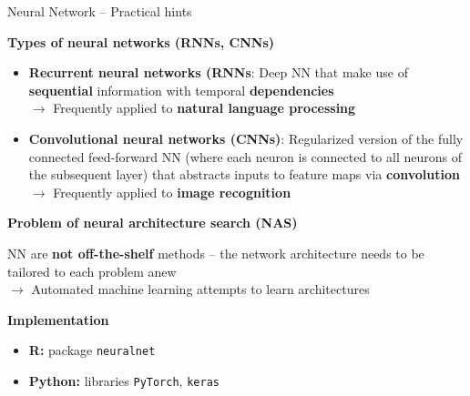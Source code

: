 \documentclass[11pt,compress,t,notes=noshow, xcolor=table]{beamer}
\newcommand{\highlight}[1]{\textcolor{highlightcol}{\textbf{#1}}}
\let\code=\texttt
\begin{document}
\begin{frame}{Neural Network -- Practical hints}

\footnotesize

\highlight{Types of neural networks (RNNs, CNNs)}

\begin{itemize}
  \item \textbf{Recurrent neural networks (RNNs}: Deep NN that make use of 
  \textbf{sequential} information with temporal \textbf{dependencies} \\
  $\rightarrow$ Frequently applied to \textbf{natural language processing}
  \item \textbf{Convolutional neural networks (CNNs)}: Regularized version of the 
  fully connected feed-forward NN (where each neuron is connected to all 
  neurons of the subsequent layer) that abstracts inputs to feature maps via 
  \textbf{convolution} \\
  $\rightarrow$ Frequently applied to \textbf{image recognition}

\end{itemize}

\medskip

\highlight{Problem of neural architecture search (NAS)}

NN are \textbf{not off-the-shelf} methods -- the network architecture needs to 
be tailored to each problem anew \\
$\rightarrow$ Automated machine learning attempts to learn architectures

\medskip
 
\highlight{Implementation}

\begin{itemize}
  \item \textbf{R:} package \code{neuralnet}
  \item \textbf{Python:} libraries \code{PyTorch}, \code{keras}
\end{itemize}

\end{frame}
\end{document}
